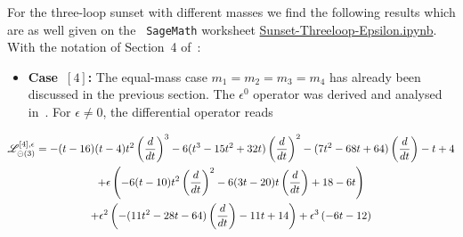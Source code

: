 \documentclass[a4paper,12pt]{article}
\numberwithin{equation}{section}
\numberwithin{figure}{section}
\def\su{\circleddash}
\begin{document}
For the three-loop sunset with different masses we find the following
results which are as well given on the  {\tt
  SageMath} worksheet \href{Sunset-Threeloop-Epsilon.ipynb}{Sunset-Threeloop-Epsilon.ipynb}. With the notation of Section~4 of~\cite{Lairez:2022zkj}:
%
\begin{itemize}
\item  {\bf Case~$[4]$:} The equal-mass case $m_1=m_2=m_3=m_4$ has already been
  discussed in the previous section. The $\epsilon^0$ operator was derived and analysed in~\cite{Vanhove:2014wqa,Bloch:2014qca,Pogel:2022yat}. For $ \epsilon \ne 0$, the differential operator reads
   \end{itemize}
  \begin{multline}
    \mathscr{L}_{\su(3)}^{[4],\epsilon}=
    -(t - 16)  (t - 4)  t^2\left(d\over dt\right)^3 - 6  (t^3 -
                              15  t^2 + 32  t)  \left(d\over dt\right)^2 - (7  t^2 - 68  t +
                              64)  \left(d\over dt\right) - t + 4\cr
                              +\epsilon \left(-6  (t - 10  ) t^2 \left(d\over dt\right)^2 -
      6  (3  t - 20  ) t \left(d\over dt\right) +18- 6  t 
      \right)\cr
    +\epsilon^2\left(-(11  t^2 -
      28  t - 64)  \left(d\over dt\right) - 11  t + 14\right)+ \epsilon^3\left(-6  t - 12\right)
  \end{multline}
\end{document}
